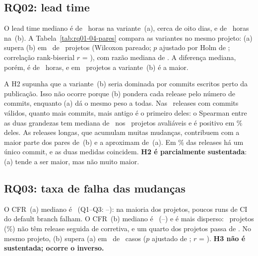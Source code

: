 \subsection{RQ02: lead time}

O lead time mediano é de \labALeadAMediana\ horas na variante~(a), cerca de oito dias,
e de \labALeadBMediana\ horas na~(b). A Tabela~\ref{tab:rq01-04-pares} compara as
variantes no mesmo projeto: (a) supera (b) em \labALeadXMaior\ de \labALeadAN\ projetos
(Wilcoxon pareado; $p$ ajustado por Holm de \labALeadPHolm; correlação rank-biserial
$r$ = \labALeadR), com razão mediana de \labALeadRazao. A diferença mediana, porém, é de
\labALeadDifMediana\ horas, e em \labALeadXMenor\ projetos a variante~(b) é a maior.

\begin{table}[htbp]
\centering\footnotesize
\caption{Variantes no mesmo projeto. $r$: correlação rank-biserial pareada; Wilcoxon e
Holm só nas comparações das hipóteses H2 e H3.}
\label{tab:rq01-04-pares}

\end{table}

A H2 supunha que a variante~(b) seria dominada por commits escritos perto da publicação.
Isso não ocorre porque (b) pondera cada release pelo número de commits, enquanto (a) dá
o mesmo peso a todas. Nas \labALeadReleases\ releases com commits válidos, quanto mais
commits, mais antigo é o primeiro deles: o Spearman entre as duas grandezas tem mediana de
\labALeadRhoMediano\ nos \labALeadProjetosRho\ projetos avaliáveis e é positivo em
\labALeadRhoPositivosPct\% deles. As releases longas, que acumulam muitas mudanças,
contribuem com a maior parte dos pares de~(b) e a aproximam de~(a). Em
\labALeadUmCommitPct\% das releases há um único commit, e as duas medidas coincidem.
\textbf{H2 é parcialmente sustentada}: (a) tende a ser maior, mas não muito maior.

\subsection{RQ03: taxa de falha das mudanças}

O CFR~(a) mediano é \labACfrAMediana\ (Q1--Q3: \labACfrAQUm--\labACfrAQTres): na maioria
dos projetos, poucos runs de CI do default branch falham. O CFR~(b) mediano é
\labACfrBMediana\ (\labACfrBQUm--\labACfrBQTres) e é mais disperso: \labACfrBZeros\ projetos
(\labACfrBZerosPct\%) não têm release seguida de corretiva, e um quarto dos projetos
passa de \labACfrBQTres. No mesmo projeto, (b) supera (a) em \labACfrXMenor\ de \labACfrBN\ casos
($p$ ajustado de \labACfrPHolm; $r$ = \labACfrR). \textbf{H3 não é sustentada; ocorre o
inverso.}


